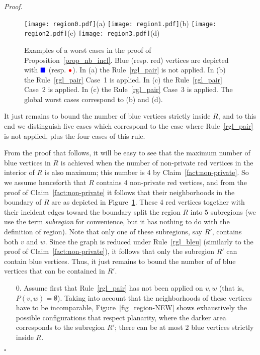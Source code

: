 \documentclass[a4paper,11pt]{article}
\newcommand{\rrgl}   [1] {Rule~\ref{#1}\xspace}
\newenvironment{proof}{\noindent \textit{Proof. }}{\hfill$\square$\vspace{.2cm}}
\begin{document}
\begin{proof}
\begin{figure}[t]
\vspace{-1.0cm}
\begin{center}
   \texttt{[image: region0.pdf]}(a)
   \texttt{[image: region1.pdf]}(b)
   \texttt{[image: region2.pdf]}(c)
   \texttt{[image: region3.pdf]}(d)
\end{center}
\vspace{-.4cm}
   \caption{Examples of a worst cases in the proof of Proposition~\ref{prop_nb_incl}.
   Blue (resp. red) vertices are depicted with $\textcolor{blue}{\blacksquare}$ (resp. \LARGE{$\textcolor{red} {\bullet}$}\normalsize{)}.
   In (a) the \rrgl{rgl_pair} is not applied.
   In (b) the \rrgl{rgl_pair} Case~1 is applied.
   In (c) the \rrgl{rgl_pair} Case~2 is applied.
   In (c) the \rrgl{rgl_pair} Case~3 is applied.
   The global worst cases correspond to (b) and (d).}
   \label{fig_region}
\end{figure}

It just remains to bound the number of blue vertices strictly inside $R$, and to this end we  distinguish five cases which correspond to the case where \rrgl{rgl_pair} is not applied, plus the four cases of this rule.



From the proof that follows, it will be easy to see that  the maximum number of blue vertices in $R$ is achieved when the number of non-private red vertices in the interior of $R$ is also maximum; this number is 4 by Claim~\ref{fact:non-private}. So we assume henceforth that $R$ contains $4$ non-private red vertices, and from the proof of Claim~\ref{fact:non-private} it follows that their neighborhoods in the boundary of $R$ are as depicted in Figure~\ref{fig_region}.   These 4 red vertices together with their incident edges toward the boundary split the region $R$ into $5$ subregions (we use the term \emph{subregion} for convenience, but it has nothing to do with the definition of region). Note that only one of these subregions, say $R'$, contains both $v$ and $w$. Since the graph is reduced under Rule~\ref{rgl_bleu} (similarly to the proof of Claim~\ref{fact:non-private}), it follows that only the subregion $R'$ can contain blue vertices. Thus, it just remains to bound the number of of blue vertices that can be contained in $R'$.
\begin{enumerate}
\item [0.]
Assume first that \rrgl{rgl_pair} has not been applied on  $v,w$ (that is, $P(v,w) = \emptyset$).
Taking into account that the neighborhoods of these vertices have to be incomparable, Figure~\ref{fig_region-NEW} shows exhaustively the possible configurations that respect planarity, where the darker area corresponds to the subregion $R'$; there can be at most $2$ blue vertices strictly inside $R$.


\end{enumerate}
\end{proof}
\end{document}
